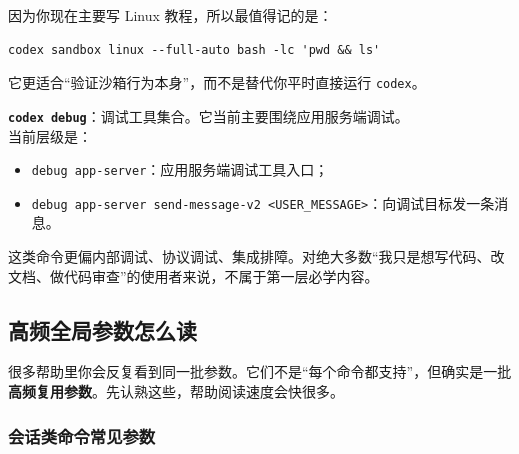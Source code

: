 \documentclass[UTF8,a4paper,12pt]{ctexart}
\begin{document}
因为你现在主要写 Linux 教程，所以最值得记的是：

\begin{lstlisting}[style=cli]
codex sandbox linux --full-auto bash -lc 'pwd && ls'
\end{lstlisting}

它更适合“验证沙箱行为本身”，而不是替代你平时直接运行 \texttt{codex}。

\medskip
\textbf{\texttt{codex debug}}：调试工具集合。它当前主要围绕应用服务端调试。\\
当前层级是：
\begin{itemize}
  \item \texttt{debug app-server}：应用服务端调试工具入口；
  \item \texttt{debug app-server send-message-v2 <USER\_MESSAGE>}：向调试目标发一条消息。
\end{itemize}

这类命令更偏内部调试、协议调试、集成排障。对绝大多数“我只是想写代码、改文档、做代码审查”的使用者来说，不属于第一层必学内容。

\subsection{高频全局参数怎么读}

很多帮助里你会反复看到同一批参数。它们不是“每个命令都支持”，但确实是一批\textbf{高频复用参数}。先认熟这些，帮助阅读速度会快很多。

\subsubsection*{会话类命令常见参数}
\end{document}
